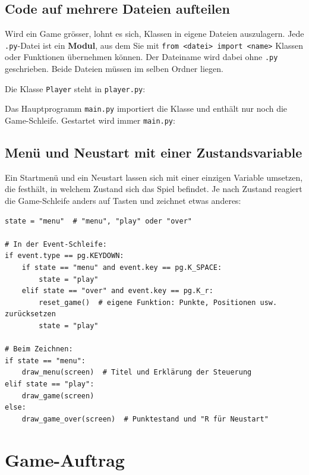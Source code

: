 \subsection{Code auf mehrere Dateien aufteilen}\label{sec:K08_mehrere_dateien}
Wird ein Game grösser, lohnt es sich, Klassen in eigene Dateien auszulagern. Jede \texttt{.py}-Datei ist ein \textbf{Modul}, aus dem Sie mit \lstinline|from <datei> import <name>| Klassen oder Funktionen übernehmen können. Der Dateiname wird dabei ohne \texttt{.py} geschrieben. Beide Dateien müssen im selben Ordner liegen.

\begin{myexample}
Die Klasse \lstinline|Player| steht in \texttt{player.py}:

Das Hauptprogramm \texttt{main.py} importiert die Klasse und enthält nur noch die Game-Schleife. Gestartet wird immer \texttt{main.py}:

\end{myexample}

\subsection{Menü und Neustart mit einer Zustandsvariable}
Ein Startmenü und ein Neustart lassen sich mit einer einzigen Variable umsetzen, die festhält, in welchem Zustand sich das Spiel befindet. Je nach Zustand reagiert die Game-Schleife anders auf Tasten und zeichnet etwas anderes:
\begin{lstlisting}
state = "menu"  # "menu", "play" oder "over"

# In der Event-Schleife:
if event.type == pg.KEYDOWN:
    if state == "menu" and event.key == pg.K_SPACE:
        state = "play"
    elif state == "over" and event.key == pg.K_r:
        reset_game()  # eigene Funktion: Punkte, Positionen usw. zurücksetzen
        state = "play"

# Beim Zeichnen:
if state == "menu":
    draw_menu(screen)  # Titel und Erklärung der Steuerung
elif state == "play":
    draw_game(screen)
else:
    draw_game_over(screen)  # Punktestand und "R für Neustart"
\end{lstlisting}

\section{Game-Auftrag}

